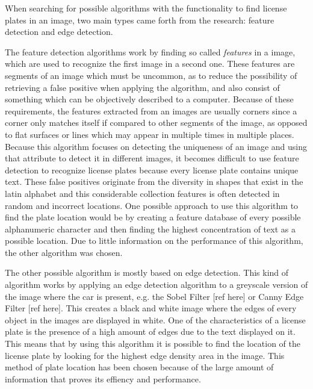 When searching for possible algorithms with the functionality to find license plates in an image, two main types came forth from the research: feature detection and edge detection. 

The feature detection algorithms work by finding so called \emph{features} in a image, which are used to recognize the first image in a second one. These features are segments of an image which must be uncommon, as to reduce the possibility of retrieving a false positive when applying the algorithm, and also consist of something which can be objectively described to a computer. Because of these requirements, the features extracted from an images are usually corners since a corner only matches itself if compared to other segments of the image, as opposed to flat surfaces or lines which may appear in multiple times in multiple places. Because this algorithm focuses on detecting the uniqueness of an image and using that attribute to detect it in different images, it becomes difficult to use feature detection to recognize license plates because every license plate contains unique text. These false positives originate from the diversity in shapes that exist in the latin alphabet and this considerable collection features is often detected in random and incorrect locations. One possible approach to use this algorithm to find the plate location would be by creating a feature database of every possible alphanumeric character and then finding the highest concentration of text as a possible location. Due to little information on the performance of this algorithm, the other algorithm was chosen.

The other possible algorithm is mostly based on edge detection. This kind of algorithm works by applying an edge detection algorithm to a greyscale version of the image where the car is present, e.g. the Sobel Filter [ref here] or Canny Edge Filter [ref here]. This creates a black and white image where the edges of every object in the images are displayed in white. One of the characteristics of a license plate is the presence of a high amount of edges due to the text displayed on it. This means that by using this algorithm it is possible to find the location of the license plate by looking for the highest edge density area in the image. This method of plate location has been chosen because of the large amount of information that proves its effiency and performance.









